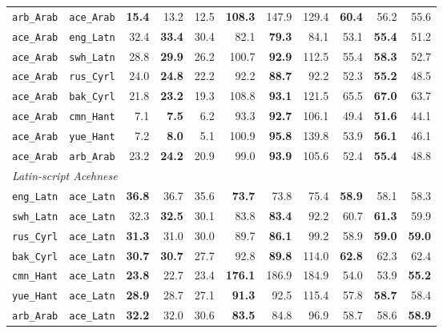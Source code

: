 \begin{longtable}{@{}ll rrr rrr rrr@{}}
\texttt{arb\_Arab} & \texttt{ace\_Arab} & \textbf{15.4} & 13.2 & 12.5 & \textbf{108.3} & 147.9 & 129.4 & \textbf{60.4} & 56.2 & 55.6 \\
\addlinespace
\texttt{ace\_Arab} & \texttt{eng\_Latn} & 32.4 & \textbf{33.4} & 30.4 & 82.1 & \textbf{79.3} & 84.1 & 53.1 & \textbf{55.4} & 51.2 \\
\texttt{ace\_Arab} & \texttt{swh\_Latn} & 28.8 & \textbf{29.9} & 26.2 & 100.7 & \textbf{92.9} & 112.5 & 55.4 & \textbf{58.3} & 52.7 \\
\texttt{ace\_Arab} & \texttt{rus\_Cyrl} & 24.0 & \textbf{24.8} & 22.2 & 92.2 & \textbf{88.7} & 92.2 & 52.3 & \textbf{55.2} & 48.5 \\
\texttt{ace\_Arab} & \texttt{bak\_Cyrl} & 21.8 & \textbf{23.2} & 19.3 & 108.8 & \textbf{93.1} & 121.5 & 65.5 & \textbf{67.0} & 63.7 \\
\texttt{ace\_Arab} & \texttt{cmn\_Hant} & 7.1 & \textbf{7.5} & 6.2 & 93.3 & \textbf{92.7} & 106.1 & 49.4 & \textbf{51.6} & 44.1 \\
\texttt{ace\_Arab} & \texttt{yue\_Hant} & 7.2 & \textbf{8.0} & 5.1 & 100.9 & \textbf{95.8} & 139.8 & 53.9 & \textbf{56.1} & 46.1 \\
\texttt{ace\_Arab} & \texttt{arb\_Arab} & 23.2 & \textbf{24.2} & 20.9 & 99.0 & \textbf{93.9} & 105.6 & 52.4 & \textbf{55.4} & 48.8 \\
\midrule
\multicolumn{11}{l}{\textit{Latin-script Acehnese}} \\
\texttt{eng\_Latn} & \texttt{ace\_Latn} & \textbf{36.8} & 36.7 & 35.6 & \textbf{73.7} & 73.8 & 75.4 & \textbf{58.9} & 58.1 & 58.3 \\
\texttt{swh\_Latn} & \texttt{ace\_Latn} & 32.3 & \textbf{32.5} & 30.1 & 83.8 & \textbf{83.4} & 92.2 & 60.7 & \textbf{61.3} & 59.9 \\
\texttt{rus\_Cyrl} & \texttt{ace\_Latn} & \textbf{31.3} & 31.0 & 30.0 & 89.7 & \textbf{86.1} & 99.2 & 58.9 & \textbf{59.0} & \textbf{59.0} \\
\texttt{bak\_Cyrl} & \texttt{ace\_Latn} & \textbf{30.7} & \textbf{30.7} & 27.7 & 92.8 & \textbf{89.8} & 114.0 & \textbf{62.8} & 62.3 & 62.4 \\
\texttt{cmn\_Hant} & \texttt{ace\_Latn} & \textbf{23.8} & 22.7 & 23.4 & \textbf{176.1} & 186.9 & 184.9 & 54.0 & 53.9 & \textbf{55.2} \\
\texttt{yue\_Hant} & \texttt{ace\_Latn} & \textbf{28.9} & 28.7 & 27.1 & \textbf{91.3} & 92.5 & 115.4 & 57.8 & \textbf{58.7} & 58.4 \\
\texttt{arb\_Arab} & \texttt{ace\_Latn} & \textbf{32.2} & 32.0 & 30.6 & \textbf{83.5} & 84.8 & 96.9 & 58.7 & 58.6 & \textbf{58.9} \\

\end{longtable}
